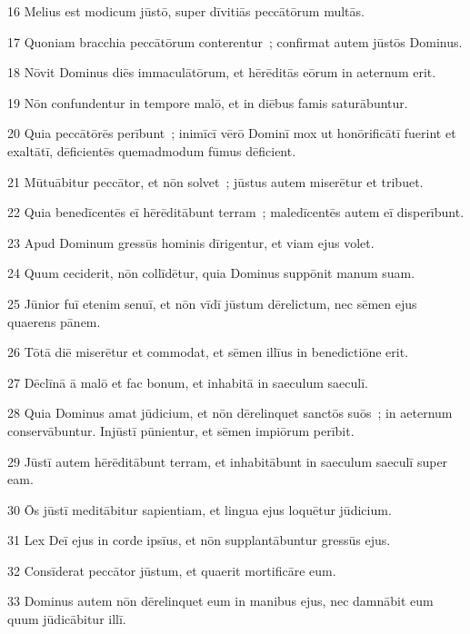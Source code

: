 \psalmVerse
  {\phantom{0}16}
  {Melius est modicum jūstō, super dīvitiās peccātōrum multās.}


\psalmVerse
  {\phantom{0}17}
  {Quoniam bracchia peccātōrum conterentur~; confirmat autem jūstōs Dominus.}


\psalmVerse
  {\phantom{0}18}
  {Nōvit Dominus diēs immaculātōrum, et hērēditās eōrum in aeternum erit.}


\psalmVerse
  {\phantom{0}19}
  {Nōn confundentur in tempore malō, et in diēbus famis saturābuntur.}


\psalmVerse
  {\phantom{0}20}
  {Quia peccātōrēs perībunt~; inimīcī vērō Dominī mox ut honōrificātī fuerint et exaltātī, dēficientēs quemadmodum fūmus dēficient.}


\psalmVerse
  {\phantom{0}21}
  {Mūtuābitur peccātor, et nōn solvet~; jūstus autem miserētur et tribuet.}


\psalmVerse
  {\phantom{0}22}
  {Quia benedīcentēs eī hērēditābunt terram~; maledīcentēs autem eī disperībunt.}


\psalmVerse
  {\phantom{0}23}
  {Apud Dominum gressūs hominis dīrigentur, et viam ejus volet.}


\psalmVerse
  {\phantom{0}24}
  {Quum ceciderit, nōn collīdētur, quia Dominus suppōnit manum suam.}


\psalmVerse
  {\phantom{0}25}
  {Jūnior fuī etenim senuī, et nōn vīdī jūstum dērelictum, nec sēmen ejus quaerens pānem.}


\psalmVerse
  {\phantom{0}26}
  {Tōtā diē miserētur et commodat, et sēmen illīus in benedictiōne erit.}


\psalmVerse
  {\phantom{0}27}
  {Dēclīnā ā malō et fac bonum, et inhabitā in saeculum saeculī.}


\psalmVerse
  {\phantom{0}28}
  {Quia Dominus amat jūdicium, et nōn dērelinquet sanctōs suōs~; in aeternum conservābuntur. Injūstī pūnientur, et sēmen impiōrum perībit.}


\psalmVerse
  {\phantom{0}29}
  {Jūstī autem hērēditābunt terram, et inhabitābunt in saeculum saeculī super eam.}


\psalmVerse
  {\phantom{0}30}
  {Ōs jūstī meditābitur sapientiam, et lingua ejus loquētur jūdicium.}


\psalmVerse
  {\phantom{0}31}
  {Lex Deī ejus in corde ipsīus, et nōn supplantābuntur gressūs ejus.}


\psalmVerse
  {\phantom{0}32}
  {Consīderat peccātor jūstum, et quaerit mortificāre eum.}


\psalmVerse
  {\phantom{0}33}
  {Dominus autem nōn dērelinquet eum in manibus ejus, nec damnābit eum quum jūdicābitur illī.}



